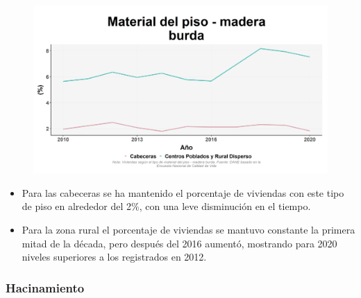     \begin{figure}[H]
        \caption[Viviendas con piso de madera burda por zonas ]{\label{piso_madera_burda_zonas} }
        \begin{center}
        \includegraphics[width=\textwidth,keepaspectratio]{img/var_176_trend.png}
        \end{center}
    \end{figure}
            \begin{itemize}
                    \item Para las cabeceras se ha mantenido el porcentaje de viviendas con este tipo de piso en alrededor del 2\%, con una leve disminución en el tiempo.
                    \item Para la zona rural el porcentaje de viviendas se mantuvo constante la primera mitad de la década, pero después del 2016 aumentó, mostrando para 2020 niveles superiores a los registrados en 2012.
                    \end{itemize}

        \subsubsection{Hacinamiento}

